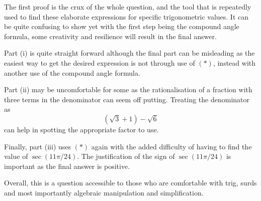 \documentclass{article}
\begin{document}
\quad The first proof is the crux of the whole question, and the tool that is repeatedly used to find these elaborate expressions for specific trigonometric values. It can be quite confusing to show yet with the first step being the compound angle formula, some creativity and resilience will result in the final answer.\par 

\quad Part (i) is quite straight forward although the final part can be misleading as the easiest way to get the desired expression is not through use of $(*)$, instead with another use of the compound angle formula.\par 

\quad Part (ii) may be uncomfortable for some as the rationalisation of a fraction with three terms in the denominator can seem off putting. Treating the denominator as 
\[
(\sqrt{3} + 1)- \sqrt{6}
\]
can help in spotting the appropriate factor to use.\par

\quad Finally, part (iii) uses $(*)$ again with the added difficulty of having to find the value of $\sec(11\pi/24)$. The justification of the sign of  $\sec(11\pi/24)$ is important as the final answer is positive.\par 
\quad Overall, this is a question accessible to those who are comfortable with trig, surds and most importantly algebraic manipulation and simplification.
\end{document}
